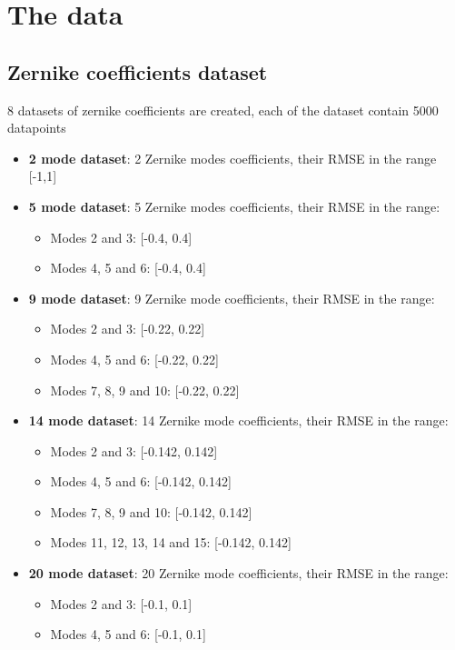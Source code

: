 \section{The data}
	
	\subsection{Zernike coefficients dataset}
			8 datasets of zernike coefficients are created, each of the dataset contain 5000 datapoints
			\begin{itemize}
				\item \textbf{2 mode dataset}: 2 Zernike modes coefficients, their RMSE in the range [-1,1]
				\item \textbf{5 mode dataset}: 5 Zernike modes coefficients, their RMSE in the range:
					\begin{itemize}
						\item Modes 2 and 3: [-0.4, 0.4]
						\item Modes 4, 5 and 6: [-0.4, 0.4]
					\end{itemize}					 
				\item \textbf{9 mode dataset}: 9 Zernike mode coefficients, their RMSE in the range:
					\begin{itemize}
						\item Modes 2 and 3: [-0.22, 0.22]
						\item Modes 4, 5 and 6: [-0.22, 0.22]
						\item Modes 7, 8, 9 and 10: [-0.22, 0.22]
					\end{itemize}					 
				\item \textbf{14 mode dataset}: 14 Zernike mode coefficients, their RMSE in the range:
					\begin{itemize}
						\item Modes 2 and 3: [-0.142, 0.142]
						\item Modes 4, 5 and 6: [-0.142, 0.142]
						\item Modes 7, 8, 9 and 10: [-0.142, 0.142]
						\item Modes 11, 12, 13, 14 and 15: [-0.142, 0.142]
					\end{itemize}					 
				\item \textbf{20 mode dataset}: 20 Zernike mode coefficients, their RMSE in the range:
					\begin{itemize}
						\item Modes 2 and 3: [-0.1, 0.1]
						\item Modes 4, 5 and 6: [-0.1, 0.1]

\end{itemize}
\end{itemize}
